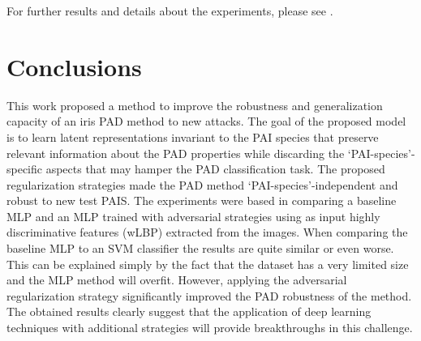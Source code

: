 For further results and details about the experiments, please see \citet{AdvInvAttack}.

\begin{table}[t]
    \centering
    \caption{Presentation attack detection accuracy (\%) in the VSIA dataset.}
    \label{tab:pad_accuracy}
\end{table}

\section{Conclusions}
\label{sec:adv_iris_attack_conclusion}
This work proposed a method to improve the robustness and generalization capacity of an iris PAD method to new attacks. The goal of the proposed model is to learn latent representations invariant to the PAI species that preserve relevant information about the PAD properties while discarding the `PAI-species'-specific aspects that may hamper the PAD classification task. The proposed regularization strategies made the PAD method `PAI-species'-independent and robust to new test PAIS.
The experiments were based in comparing a baseline MLP and an MLP trained with adversarial strategies using as input highly discriminative features (wLBP) extracted from the images. When comparing the baseline MLP to an SVM classifier the results are quite similar or even worse. This can be explained simply by the fact that the dataset has a very limited size and the MLP method will overfit.
However, applying the adversarial regularization strategy significantly improved the PAD robustness of the method. The obtained results clearly suggest that the application of deep learning techniques with additional strategies will provide breakthroughs in this challenge.

